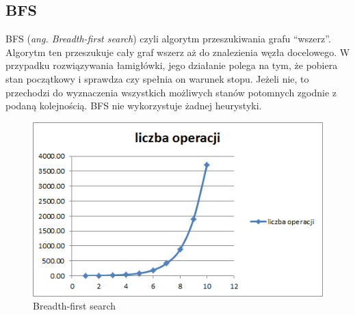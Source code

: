 \documentclass{classrep}
\begin{document}
  
    \cleardoublepage
  \subsection{BFS}
  BFS (\textit{ang. Breadth-first search}) czyli algorytm przeszukiwania grafu ``wszerz''. Algorytm ten przeszukuje cały graf wszerz aż do znalezienia węzła docelowego. W przypadku rozwiązywania łamigłówki, jego działanie polega na tym, że pobiera stan początkowy i sprawdza czy spełnia on warunek stopu. Jeżeli nie, to przechodzi do wyznaczenia wszystkich możliwych stanów potomnych zgodnie z podaną kolejnością. BFS nie wykorzystuje żadnej heurystyki.
	
		\begin{table}
\centering
{}
\caption{Breadth-first search}
\end{table}

\begin{figure}[ht]
\centering
			\includegraphics[scale=0.65]{pictures/bfs_operacje.png}
	\caption{Breadth-first search}
	\label{fig:Breadth-first search}
\end{figure}
\end{document}
